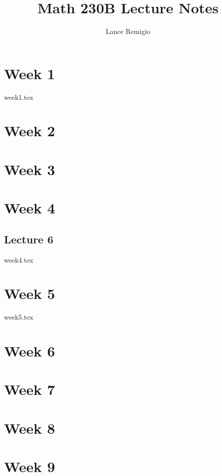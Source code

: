\documentclass[a4paper]{book}
\title{Math 230B Lecture Notes}
\author{Lance Remigio}
\begin{document}
\maketitle

\chapter{Week 1}

{week1.tex}

\chapter{Week 2}


\chapter{Week 3}



\chapter{Week 4}

\section{Lecture 6}

{week4.tex}

\chapter{Week 5}

{week5.tex}

\chapter{Week 6}



\chapter{Week 7}



\chapter{Week 8}



\chapter{Week 9}
\end{document}
